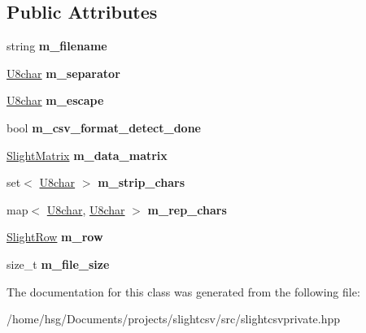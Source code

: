 \subsection*{Public Attributes}
\begin{DoxyCompactItemize}
\item 
\mbox{\label{classutils_1_1SlightCSVPrivate_a1ca95cf105a198d5198d201d6b5593fe}} 
string {\bfseries m\+\_\+filename}
\item 
\mbox{\label{classutils_1_1SlightCSVPrivate_ac335765d96d18606446e2324a39ebd1d}} 
\hyperlink{classutils_1_1U8char}{U8char} {\bfseries m\+\_\+separator}
\item 
\mbox{\label{classutils_1_1SlightCSVPrivate_aeaa1ac369164769df3d357557c40d61e}} 
\hyperlink{classutils_1_1U8char}{U8char} {\bfseries m\+\_\+escape}
\item 
\mbox{\label{classutils_1_1SlightCSVPrivate_acb8d8f3bcb5d902799d05583cf01c9c0}} 
bool {\bfseries m\+\_\+csv\+\_\+format\+\_\+detect\+\_\+done}
\item 
\mbox{\label{classutils_1_1SlightCSVPrivate_a493870cd6f6add7bd4488d10dd97f2dc}} 
\hyperlink{classutils_1_1SlightMatrix}{Slight\+Matrix} {\bfseries m\+\_\+data\+\_\+matrix}
\item 
\mbox{\label{classutils_1_1SlightCSVPrivate_a06cd2806efae95528443d4aa83d6164c}} 
set$<$ \hyperlink{classutils_1_1U8char}{U8char} $>$ {\bfseries m\+\_\+strip\+\_\+chars}
\item 
\mbox{\label{classutils_1_1SlightCSVPrivate_a182ab22b5052a0b1328d0d57f39fed67}} 
map$<$ \hyperlink{classutils_1_1U8char}{U8char}, \hyperlink{classutils_1_1U8char}{U8char} $>$ {\bfseries m\+\_\+rep\+\_\+chars}
\item 
\mbox{\label{classutils_1_1SlightCSVPrivate_aa1734b01fd9826c41aaefa5df7367468}} 
\hyperlink{classutils_1_1SlightRow}{Slight\+Row} {\bfseries m\+\_\+row}
\item 
\mbox{\label{classutils_1_1SlightCSVPrivate_ab452b617c295b5cdbf5500fca94f622d}} 
size\+\_\+t {\bfseries m\+\_\+file\+\_\+size}
\end{DoxyCompactItemize}


The documentation for this class was generated from the following file\+:\begin{DoxyCompactItemize}
\item 
/home/hsg/\+Documents/projects/slightcsv/src/slightcsvprivate.\+hpp\end{DoxyCompactItemize}
